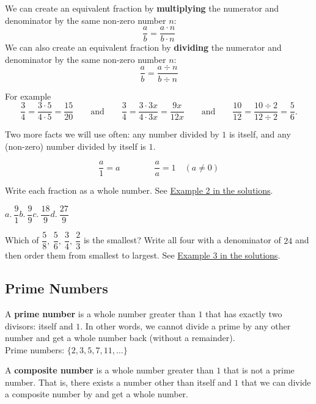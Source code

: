 \documentclass[letter]{article}
\newenvironment{keybox}
  {\begin{lrbox}{\keyboxsave}\begin{minipage}{\dimexpr\linewidth-2\fboxsep-2\fboxrule\relax}}
  {\end{minipage}\end{lrbox}\par\noindent\fbox{\usebox{\keyboxsave}}\par}
\newcommand{\exbox}[1]{\fbox{\textbf{Example #1}}}
\newcommand{\chp}{}
\newcommand{\seesol}[1]{See \hyperref[sec:\chp ex#1]{Example #1 in the solutions}.}
\begin{document}
\begin{keybox}
We can create an equivalent fraction by \textbf{multiplying} the numerator and denominator by the same non-zero number $n$:
\[\frac ab=\frac{a\cdot n}{b\cdot n}\]
We can also create an equivalent fraction by \textbf{dividing} the numerator and denominator by the same non-zero number $n$:
\[\frac ab=\frac{a\div n}{b\div n}\]
\end{keybox}

For example
\[
  \frac34=\frac{3\cdot5}{4\cdot5}=\frac{15}{20}
  \qquad\text{and}\qquad
  \frac34=\frac{3\cdot3x}{4\cdot3x}=\frac{9x}{12x}
  \qquad\text{and}\qquad
  \frac{10}{12}=\frac{10\div2}{12\div2}=\frac56.
\]

Two more facts we will use often: any number divided by $1$ is itself, and any (non-zero) number divided by itself is $1$.

\begin{keybox}
\[\frac a1=a\qquad\qquad \frac aa=1\quad(a\neq0)\]
\end{keybox}

\exbox{2} Write each fraction as a whole number. \seesol{2}

\begin{center}
$a.\ \dfrac91$\qquad $b.\ \dfrac99$\qquad $c.\ \dfrac{18}9$\qquad $d.\ \dfrac{27}9$
\end{center}

\exbox{3} Which of $\dfrac58,\ \dfrac56,\ \dfrac34,\ \dfrac23$ is the smallest? Write all four with a denominator of $24$ and then order them from smallest to largest. \seesol{3}


\subsection{Prime Numbers}

\begin{keybox}
A \textbf{prime number} is a whole number greater than $1$ that has exactly two divisors: itself and $1$. In other words, we cannot divide a prime by any other number and get a whole number back (without a remainder).\\[4pt]
Prime numbers: $\{2,3,5,7,11,\ldots\}$
\end{keybox}

\begin{keybox}
A \textbf{composite number} is a whole number greater than $1$ that is not a prime number. That is, there exists a number other than itself and $1$ that we can divide a composite number by and get a whole number.
\end{keybox}
\end{document}
